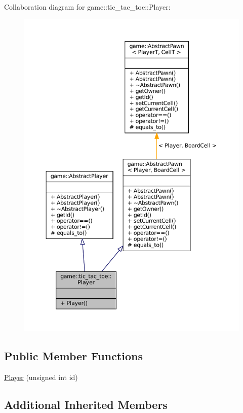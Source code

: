 Collaboration diagram for game\+:\+:tic\+\_\+tac\+\_\+toe\+:\+:Player\+:
\nopagebreak
\begin{figure}[H]
\begin{center}
\leavevmode
\includegraphics[width=350pt]{classgame_1_1tic__tac__toe_1_1_player__coll__graph}
\end{center}
\end{figure}
\subsection*{Public Member Functions}
\begin{DoxyCompactItemize}
\item 
\hyperlink{classgame_1_1tic__tac__toe_1_1_player_ac9259561465521842ee71a5a0ebd4896}{Player} (unsigned int id)
\end{DoxyCompactItemize}
\subsection*{Additional Inherited Members}


